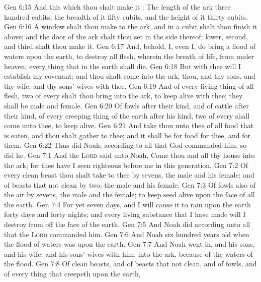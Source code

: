 \vs Gen 6:15 And this  which thou shalt make it : The length of the ark  three hundred cubits, the breadth of it fifty cubits, and the height of it thirty cubits.
\vs Gen 6:16 A window shalt thou make to the ark, and in a cubit shalt thou finish it above; and the door of the ark shalt thou set in the side thereof;  lower, second, and third  shalt thou make it.
\vs Gen 6:17 And, behold, I, even I, do bring a flood of waters upon the earth, to destroy all flesh, wherein  the breath of life, from under heaven;  every thing that  in the earth shall die.
\vs Gen 6:18 But with thee will I establish my covenant; and thou shalt come into the ark, thou, and thy sons, and thy wife, and thy sons' wives with thee.
\vs Gen 6:19 And of every living thing of all flesh, two of every  shalt thou bring into the ark, to keep  alive with thee; they shall be male and female.
\vs Gen 6:20 Of fowls after their kind, and of cattle after their kind, of every creeping thing of the earth after his kind, two of every  shall come unto thee, to keep  alive.
\vs Gen 6:21 And take thou unto thee of all food that is eaten, and thou shalt gather  to thee; and it shall be for food for thee, and for them.
\vs Gen 6:22 Thus did Noah; according to all that God commanded him, so did he.
\vs Gen 7:1 And the \textsc{Lord} said unto Noah, Come thou and all thy house into the ark; for thee have I seen righteous before me in this generation.
\vs Gen 7:2 Of every clean beast thou shalt take to thee by sevens, the male and his female: and of beasts that  not clean by two, the male and his female.
\vs Gen 7:3 Of fowls also of the air by sevens, the male and the female; to keep seed alive upon the face of all the earth.
\vs Gen 7:4 For yet seven days, and I will cause it to rain upon the earth forty days and forty nights; and every living substance that I have made will I destroy from off the face of the earth.
\vs Gen 7:5 And Noah did according unto all that the \textsc{Lord} commanded him.
\vs Gen 7:6 And Noah  six hundred years old when the flood of waters was upon the earth.
\vs Gen 7:7 And Noah went in, and his sons, and his wife, and his sons' wives with him, into the ark, because of the waters of the flood.
\vs Gen 7:8 Of clean beasts, and of beasts that  not clean, and of fowls, and of every thing that creepeth upon the earth,

